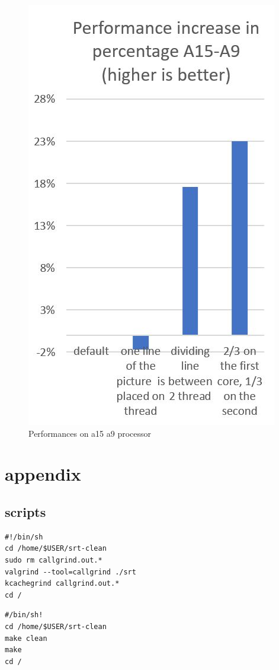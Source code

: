\documentclass[journal]{IEEEtran}
\begin{document}
\begin{figure}[!h]
	\centering
	\includegraphics[width=.8\linewidth]{a15a9}
	\caption{Performances on a15 a9 processor}
	\label{fig:a15a9}
\end{figure}


\section{appendix}
\subsection{scripts}
\begin{lstlisting}
#!/bin/sh
cd /home/$USER/srt-clean
sudo rm callgrind.out.*
valgrind --tool=callgrind ./srt
kcachegrind callgrind.out.*
cd /
\end{lstlisting}

\begin{lstlisting}
#/bin/sh!
cd /home/$USER/srt-clean
make clean
make
cd /
\end{lstlisting}
\end{document}
